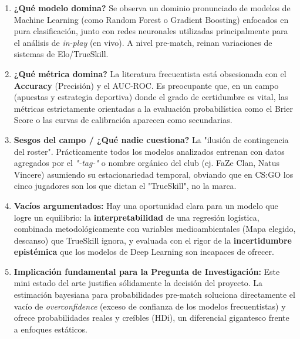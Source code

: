 \documentclass{article}
\begin{document}
\begin{enumerate}
    \item \textbf{¿Qué modelo domina?} Se observa un dominio pronunciado de modelos de Machine Learning (como Random Forest o Gradient Boosting) enfocados en pura clasificación, junto con redes neuronales utilizadas principalmente para el análisis de \textit{in-play} (en vivo). A nivel pre-match, reinan variaciones de sistemas de Elo/TrueSkill.
    
    \item \textbf{¿Qué métrica domina?} La literatura frecuentista está obsesionada con el \textbf{Accuracy} (Precisión) y el AUC-ROC. Es preocupante que, en un campo (apuestas y estrategia deportiva) donde el grado de certidumbre es vital, las métricas estrictamente orientadas a la evaluación probabilística como el Brier Score o las curvas de calibración aparecen como secundarias.
    
    \item \textbf{Sesgos del campo / ¿Qué nadie cuestiona?} La "ilusión de contingencia del roster". Prácticamente todos los modelos analizados entrenan con datos agregados por el \textit{"-tag-"} o nombre orgánico del club (ej. FaZe Clan, Natus Vincere) asumiendo su estacionariedad temporal, obviando que en CS:GO los cinco jugadores son los que dictan el "TrueSkill", no la marca.
    
    \item \textbf{Vacíos argumentados:} Hay una oportunidad clara para un modelo que logre un equilibrio: la \textbf{interpretabilidad} de una regresión logística, combinada metodológicamente con variables medioambientales (Mapa elegido, descanso) que TrueSkill ignora, y evaluada con el rigor de la \textbf{incertidumbre epistémica} que los modelos de Deep Learning son incapaces de ofrecer.
    
    \item \textbf{Implicación fundamental para la Pregunta de Investigación:} Este mini estado del arte justifica sólidamente la decisión del proyecto. La estimación bayesiana para probabilidades pre-match soluciona directamente el vacío de \textit{overconfidence} (exceso de confianza de los modelos frecuentistas) y ofrece probabilidades reales y creíbles (HDi), un diferencial gigantesco frente a enfoques estáticos.
\end{enumerate}
\end{document}
